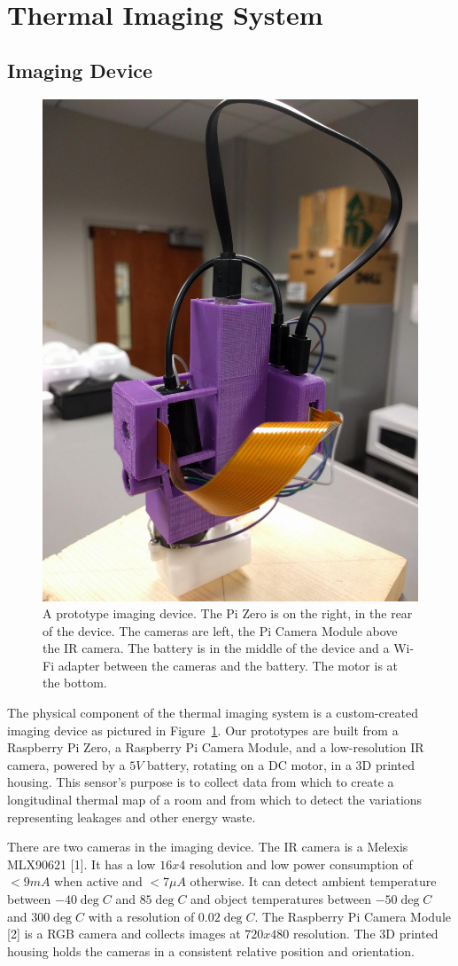 \
\section{Thermal Imaging System}

\subsection{Imaging Device}

\begin{figure}
	\centering
	\includegraphics[height=.45\textheight,width=.45\textwidth,keepaspectratio]{../img/CameraModule.jpg}
	\caption[Imaging Device]{A prototype imaging device. The Pi Zero is on the
		right, in the rear of the device. The cameras are left, the Pi Camera 
		Module above the IR camera. The battery is in the middle of the device
		and a Wi-Fi adapter between the cameras and the battery. The motor is
		at the bottom.}
	\label{tis:imd:cam}
\end{figure}

The physical component of the thermal imaging system is a custom-created imaging
device as pictured in Figure~\ref{tis:imd:cam}. Our prototypes are built from a
Raspberry Pi Zero, a Raspberry Pi Camera Module, and a low-resolution IR camera,
powered by a $5V$ battery, rotating on a DC motor, in a 3D printed housing. This
sensor's purpose is to collect data from which to create a longitudinal thermal
map of a room and from which to detect the variations representing leakages and
other energy waste.

There are two cameras in the imaging device. The IR camera is a Melexis MLX90621
[1]. It has a low $16x4$ resolution and low power consumption of $<9mA$ when
active and $<7\mu A$ otherwise. It can detect ambient temperature between
$-40\deg C$ and $85\deg C$ and object temperatures between $-50\deg C$ and
$300\deg C$ with a resolution of $0.02\deg C$. The Raspberry Pi Camera Module [2]
is a RGB camera and collects images at $720x480$ resolution. The 3D printed 
housing holds the cameras in a consistent relative position and orientation.

